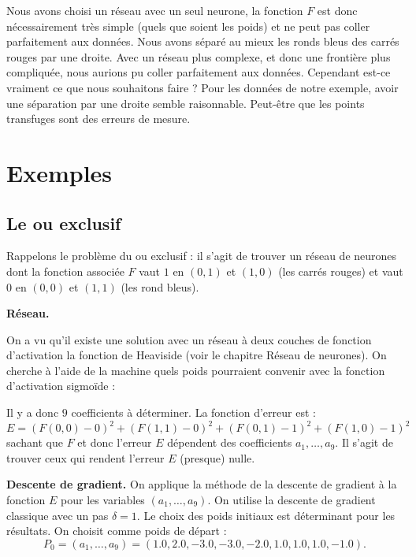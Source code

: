 \documentclass[11pt,class=report,crop=false]{standalone}
\begin{document}
\begin{exemple}
Nous avons choisi un réseau avec un seul neurone, la fonction $F$ est donc nécessairement très simple (quels que soient les poids) et ne peut pas \og{}coller\fg{} parfaitement aux données. 
Nous avons séparé au mieux les ronds bleus des carrés rouges par une droite. Avec un réseau plus complexe, et donc une frontière plus compliquée, nous aurions pu \og{}coller\fg{} parfaitement aux données. Cependant est-ce vraiment ce que nous souhaitons faire ? Pour les données de notre exemple, avoir une séparation par une droite semble raisonnable. Peut-être que les points transfuges sont des erreurs de mesure.

\end{exemple}




\section{Exemples}

\subsection{Le \og{}ou exclusif\fg{}}

Rappelons le problème du \og{}ou exclusif\fg{} : il s'agit de trouver un réseau de neurones dont la fonction associée $F$ vaut $1$ en $(0,1)$ et $(1,0)$ (les carrés rouges) et vaut $0$ en $(0,0)$ et $(1,1)$ (les rond bleus).


\textbf{Réseau.}

On a vu qu'il existe une solution avec un réseau à deux couches de fonction d'activation la fonction de Heaviside (voir le chapitre \og{}Réseau de neurones\fg{}).
On cherche à l'aide de la machine quels poids pourraient convenir avec la fonction d'activation sigmoïde :

Il y a donc $9$ coefficients à déterminer.
La fonction d'erreur est :
$$E = (F(0,0) - 0)^2 + (F(1,1) - 0)^2 + (F(0,1)-1)^2 + (F(1,0) - 1)^2$$
sachant que $F$ et donc l'erreur $E$ dépendent des coefficients $a_1,\ldots,a_9$.
Il s'agit de trouver ceux qui rendent l'erreur $E$ (presque) nulle.

\bigskip

\textbf{Descente de gradient.}
On applique la méthode de la descente de gradient à la fonction $E$ pour les variables $(a_1,\ldots,a_9)$.
On utilise la descente de gradient classique avec un pas $\delta = 1$. 
Le choix des poids initiaux est déterminant pour les résultats.
On choisit comme poids de départ :
$$P_0 = (a_1,\ldots,a_9) = (1.0, 2.0, -3.0, -3.0, -2.0, 1.0, 1.0, 1.0, -1.0).$$
\end{document}
